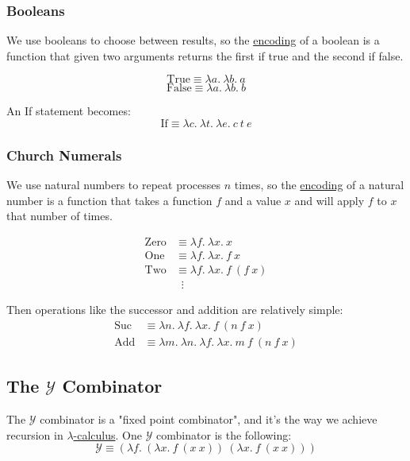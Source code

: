 \documentclass{article}
\begin{document}
\subsubsection{Booleans}
We use booleans to choose between results, so the \hyperref[church-encoding]{encoding} of a boolean is a function that given two arguments returns the first if true and the second if false.

\[\text{True} \equiv \lambda a. \: \lambda b. \: a\]
\[\text{False} \equiv \lambda a. \: \lambda b. \: b\]

An If statement becomes:
\[\text{If} \equiv \lambda c. \: \lambda t. \: \lambda e. \: c\:t\:e\]

\subsubsection{Church Numerals}\label{church-numeral}
We use natural numbers to repeat processes $n$ times, so the \hyperref[church-encoding]{encoding} of a natural number is a function that takes a function $f$ and a value $x$ and will apply $f$ to $x$ that number of times.

\begin{equation}
\begin{aligned}
    \text{Zero} &\equiv \lambda f. \: \lambda x. \: x \nonumber \\
    \text{One}  &\equiv \lambda f. \: \lambda x. \: f \: x \nonumber \\
    \text{Two}  &\equiv \lambda f. \: \lambda x. \: f \: (f \: x) \nonumber \\
                &\;\;\vdots
\end{aligned}
\end{equation}

Then operations like the successor and addition are relatively simple:
\begin{equation}
\begin{aligned}
    \text{Suc} &\equiv \lambda n. \: \lambda f. \: \lambda x. \: f \: (n\:f\:x) \nonumber \\
    \text{Add}  &\equiv \lambda m. \: \lambda n. \: \lambda f. \: \lambda x. \: m \: f \: (n \: f \: x) \nonumber
\end{aligned}
\end{equation}

\subsection{The $\mathcal{Y}$ Combinator}\label{y-combinator}
The $\mathcal{Y}$ combinator is a "fixed point combinator", and it's the way we achieve recursion in \hyperref[lambda-calculus]{$\lambda$-calculus}. One $\mathcal{Y}$ combinator is the following:
\[\mathcal{Y} \equiv (\lambda f. \: (\lambda x. \: f \: (x \: x)) \: (\lambda x. \: f \: (x \: x)))\]
\end{document}
